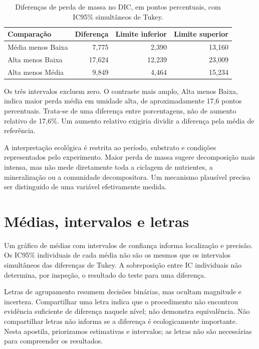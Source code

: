 \begin{table}[H]\centering\small
\caption{Diferenças de perda de massa no DIC, em pontos percentuais, com IC95\% simultâneos de Tukey.}
\begin{tabular}{lrrr}\toprule
Comparação & Diferença & Limite inferior & Limite superior\\\midrule
Média menos Baixa & 7,775 & 2,390 & 13,160\\
Alta menos Baixa & 17,624 & 12,239 & 23,009\\
Alta menos Média & 9,849 & 4,464 & 15,234\\\bottomrule
\end{tabular}\end{table}

Os três intervalos excluem zero. O contraste mais amplo, Alta menos Baixa, indica maior perda média em umidade alta, de aproximadamente 17,6 pontos percentuais. Trata-se de uma diferença entre porcentagens, não de aumento relativo de 17,6\%. Um aumento relativo exigiria dividir a diferença pela média de referência.

A interpretação ecológica é restrita ao período, substrato e condições representados pelo experimento. Maior perda de massa sugere decomposição mais intensa, mas não mede diretamente toda a ciclagem de nutrientes, a mineralização ou a comunidade decompositora. Um mecanismo plausível precisa ser distinguido de uma variável efetivamente medida.

\section{Médias, intervalos e letras}
Um gráfico de médias com intervalos de confiança informa localização e precisão. Os IC95\% individuais de cada média não são os mesmos que os intervalos simultâneos das diferenças de Tukey. A sobreposição entre IC individuais não determina, por inspeção, o resultado do teste para uma diferença.


Letras de agrupamento resumem decisões binárias, mas ocultam magnitude e incerteza. Compartilhar uma letra indica que o procedimento não encontrou evidência suficiente de diferença naquele nível; não demonstra equivalência. Não compartilhar letras não informa se a diferença é ecologicamente importante. Nesta apostila, priorizamos estimativas e intervalos; as letras não são necessárias para compreender os resultados.


